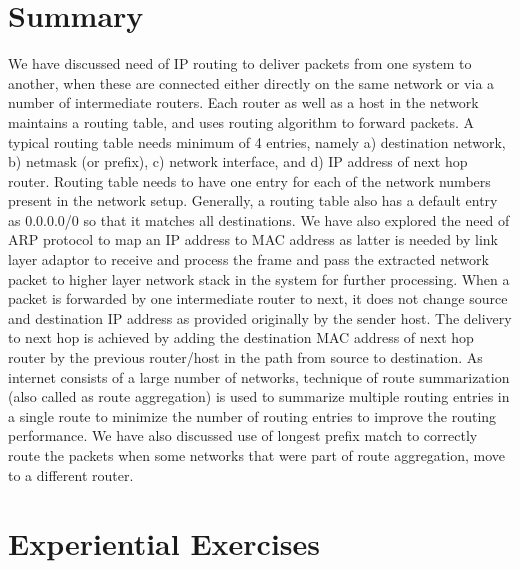 \begin{multicols}{2}
\vspace{-.5cm}

\section{Summary}\label{chap2-sec8}

\vspace{-.25cm}

We have discussed need of IP routing to deliver packets from one system to another, when these are connected either directly on the same network or via a number of intermediate routers. Each router as well as a host in the network maintains a routing table, and uses routing algorithm to forward packets.  A typical routing table needs minimum of 4 entries, namely a) destination network, b) netmask (or prefix), c) network interface, and d) IP address of next hop router. Routing table needs to have one entry for each of the network numbers present in the network setup. Generally, a routing table also has a default entry as 0.0.0.0/0 so that it matches all destinations. We have also explored the need of ARP protocol to map an IP address to MAC address as latter is needed by link layer adaptor to receive and process the frame and pass the extracted network packet to higher layer network stack in the system for further processing. When a packet is forwarded by one intermediate router to next, it does not change source and destination IP address as provided originally by the sender host. The delivery to next hop is achieved by adding the destination MAC address of next hop router by the previous router/host in the path from source to destination. As internet consists of a large number of networks, technique of route summarization (also called as route aggregation) is used to summarize multiple routing entries in a single route to minimize the number of routing entries to improve the routing performance. We have also discussed use of longest prefix match to correctly route the packets when some networks that were part of route aggregation, move to a different router.

\vspace{-.5cm}

\section{Experiential Exercises}\label{chap2-sec9}

\vspace{-.25cm}


\end{multicols}
